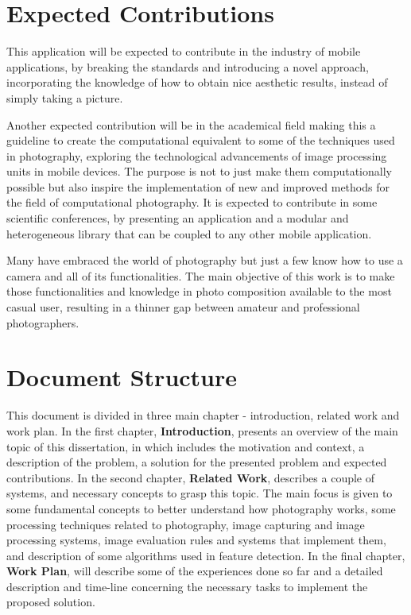 \section{Expected Contributions}

This application will be expected to contribute in the industry of mobile applications, by breaking the standards and introducing a novel approach, incorporating the knowledge of how to obtain nice aesthetic results, instead of simply taking a picture. 

Another expected contribution will be in the academical field making this a guideline to create the computational equivalent to some of the techniques used in photography, exploring the technological advancements of image processing units in mobile devices. The purpose is not to just make them computationally possible but also inspire the implementation of new and improved methods for the field of computational photography. It is expected to contribute in some scientific conferences, by presenting an application and a modular and heterogeneous library that can be coupled to any other mobile application.

Many have embraced the world of photography but just a few know how to use a camera and all of its functionalities. The main objective of this work is to make those functionalities and knowledge in photo composition available to the most casual user, resulting in a thinner gap between amateur and professional photographers.

\section{Document Structure}

This document is divided in three main chapter - introduction, related work and work plan. In the first chapter, \textbf{Introduction}, presents an overview of the main topic of this dissertation, in which includes the motivation and context, a description of the problem, a solution for the presented problem and expected contributions.
In the second chapter, \textbf{Related Work}, describes a couple of systems, and necessary concepts to grasp this topic. The main focus is given to some fundamental concepts to better understand how photography works, some processing techniques related to photography, image capturing and image processing systems, image evaluation rules and systems that implement them, and description of some algorithms used in feature detection. In the final chapter, \textbf{Work Plan}, will describe some of the experiences done so far and a detailed description and time-line concerning the necessary tasks to implement the proposed solution.